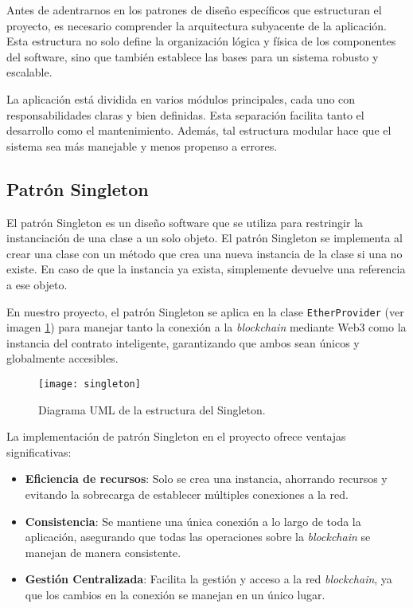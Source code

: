 Antes de adentrarnos en los patrones de diseño específicos que estructuran el proyecto, es necesario comprender la arquitectura subyacente de la aplicación. 
Esta estructura no solo define la organización lógica y física de los componentes del software, sino que también establece las bases para un sistema robusto y escalable.

La aplicación está dividida en varios módulos principales, cada uno con responsabilidades claras y bien definidas. Esta separación facilita tanto el desarrollo como el mantenimiento. Además, tal estructura modular hace que el sistema sea más manejable y menos propenso a errores.

\subsection{Patrón Singleton}

El patrón Singleton es un diseño software que se utiliza para restringir la instanciación de una clase a un solo objeto. El patrón Singleton se implementa al crear una clase con un método que crea una nueva instancia de la clase si una no existe. En caso de que la instancia ya exista, simplemente devuelve una referencia a ese objeto.

En nuestro proyecto, el patrón Singleton se aplica en la clase \texttt{EtherProvider} (ver imagen \ref{fig:singleton}) para manejar tanto la conexión a la \textit{blockchain} mediante Web3 como la instancia del contrato inteligente, garantizando que ambos sean únicos y globalmente accesibles.

\begin{figure}[h]
	\centering
	\texttt{[image: singleton]}
	\caption[Diagrama Singleton]{Diagrama UML de la estructura del Singleton.}
	\label{fig:singleton}
\end{figure}

La implementación de patrón Singleton en el proyecto ofrece ventajas significativas: 

\begin{itemize}
\item \textbf{Eficiencia de recursos}: Solo se crea una instancia, ahorrando recursos y evitando la sobrecarga de establecer múltiples conexiones a la red.

\item \textbf{Consistencia}: Se mantiene una única conexión a lo largo de toda la aplicación, asegurando que todas las operaciones sobre la \textit{blockchain} se manejan de manera consistente.

\item \textbf{Gestión Centralizada}: Facilita la gestión y acceso a la red \textit{blockchain}, ya que los cambios en la conexión se manejan en un único lugar.
\end{itemize}

